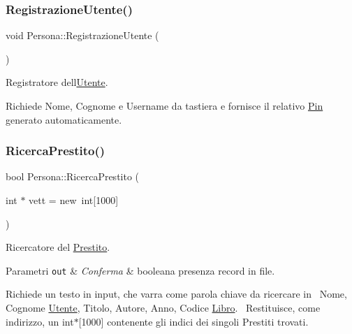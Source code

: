 \subsubsection{\texorpdfstring{Registrazione\+Utente()}{RegistrazioneUtente()}}
{\footnotesize\ttfamily void Persona\+::\+Registrazione\+Utente (\begin{DoxyParamCaption}{ }\end{DoxyParamCaption})}



Registratore dell\textquotesingle{}\mbox{\hyperlink{class_utente}{Utente}}. 

Richiede Nome, Cognome e Username da tastiera e fornisce il relativo \mbox{\hyperlink{class_pin}{Pin}} generato automaticamente. \mbox{\label{class_persona_ab06e2688ff0eb5c51177a44d33232070}} 
\subsubsection{\texorpdfstring{Ricerca\+Prestito()}{RicercaPrestito()}}
{\footnotesize\ttfamily bool Persona\+::\+Ricerca\+Prestito (\begin{DoxyParamCaption}\item[{int $\ast$}]{vett = {\ttfamily new~int\mbox{[}1000\mbox{]}} }\end{DoxyParamCaption})}



Ricercatore del \mbox{\hyperlink{class_prestito}{Prestito}}. 


\begin{DoxyParams}[1]{Parametri}
\mbox{\tt out}  & {\em Conferma} & booleana presenza record in file.\\
\hline
\end{DoxyParams}
Richiede un testo in input, che varra\textquotesingle{} come parola chiave da ricercare in~\newline
Nome, Cognome \mbox{\hyperlink{class_utente}{Utente}}, Titolo, Autore, Anno, Codice \mbox{\hyperlink{class_libro}{Libro}}.~\newline
Restituisce, come indirizzo, un int$\ast$\mbox{[}1000\mbox{]} contenente gli indici dei singoli Prestiti trovati. \mbox{\label{class_persona_a11bc0159627eb83be83b00c56ff1a3f9}} 
